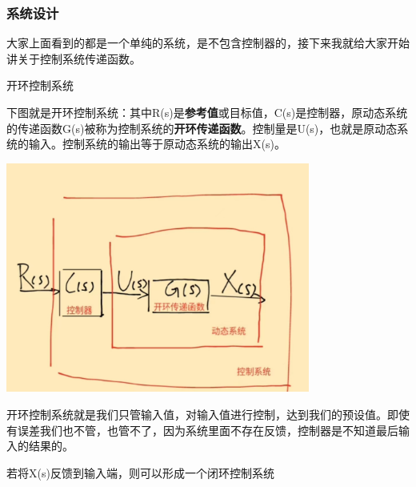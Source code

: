 \documentclass[UTF8,a4paper,12pt]{ctexart}
\begin{document}
    \subsubsection{系统设计}
    大家上面看到的都是一个单纯的系统，是不包含控制器的，接下来我就给大家开始讲关于控制系统传递函数。
    \begin{titlebox}{开环控制系统}
      \begin{flushleft}
        下图就是开环控制系统：其中R(s)是\textbf{参考值}或目标值，C(s)是控制器，原动态系统的传递函数G(s)被称为控制系统的\textbf{开环传递函数}。控制量是U(s)，也就是原动态系统的输入。控制系统的输出等于原动态系统的输出X(s)。
      \end{flushleft}
       \par \includegraphics[width=10cm]{picture/control system.png}
      \begin{flushleft}
        开环控制系统就是我们只管输入值，对输入值进行控制，达到我们的预设值。即使有误差我们也不管，也管不了，因为系统里面不存在反馈，控制器是不知道最后输入的结果的。
      \end{flushleft}


    \end{titlebox}
    若将X(s)反馈到输入端，则可以形成一个闭环控制系统
\end{document}
